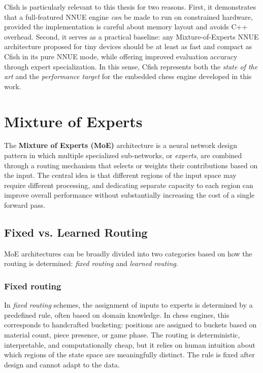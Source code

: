 Cfish is particularly relevant to this thesis for two reasons. First, it demonstrates that a full-featured NNUE engine \emph{can} be made to run on constrained hardware, provided the implementation is careful about memory layout and avoids C++ overhead. Second, it serves as a practical baseline: any Mixture-of-Experts NNUE architecture proposed for tiny devices should be at least as fast and compact as Cfish in its pure NNUE mode, while offering improved evaluation accuracy through expert specialization. In this sense, Cfish represents both the \emph{state of the art} and the \emph{performance target} for the embedded chess engine developed in this work.



\section{Mixture of Experts}

The \textbf{Mixture of Experts (MoE)} architecture is a neural network design pattern in which multiple specialized sub-networks, or \emph{experts}, are combined through a routing mechanism that selects or weights their contributions based on the input. The central idea is that different regions of the input space may require different processing, and dedicating separate capacity to each region can improve overall performance without substantially increasing the cost of a single forward pass.

\subsection{Fixed vs. Learned Routing}

MoE architectures can be broadly divided into two categories based on how the routing is determined: \emph{fixed routing} and \emph{learned routing}.

\subsubsection{Fixed routing}
In \emph{fixed routing} schemes, the assignment of inputs to experts is determined by a predefined rule, often based on domain knowledge. In chess engines, this corresponds to handcrafted bucketing: positions are assigned to buckets based on material count, piece presence, or game phase. The routing is deterministic, interpretable, and computationally cheap, but it relies on human intuition about which regions of the state space are meaningfully distinct. The rule is fixed after design and cannot adapt to the data.


